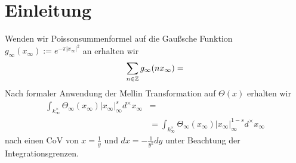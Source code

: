 \section{Einleitung}
\label{sec:kapitel1}

Wenden wir Poissonsummenformel auf die Gaußsche Funktion $g_\infty(x_\infty) := e^{-\pi |x_\infty|^2}$ an erhalten wir
\begin{align}
	\sum_{n \in {\mathbb{Z}}} g_\infty( n x_\infty ) = 
\end{align}
Nach formaler Anwendung der Mellin Transformation auf $\Theta(x)$ erhalten wir
\begin{align}
	\int_{k_\infty^\times} \Theta_\infty(x_\infty) |x_\infty|_\infty^s d^\times x_\infty &= \\
	&=\int_{k_\infty^\times} \Theta_\infty(x_\infty) |x_\infty|_\infty^{1-s} d^\times x_\infty
\end{align}
nach einen CoV von $x = \frac{1}{y}$ und $dx = -\frac{1}{y^2}dy$ unter Beachtung der Integrationsgrenzen.